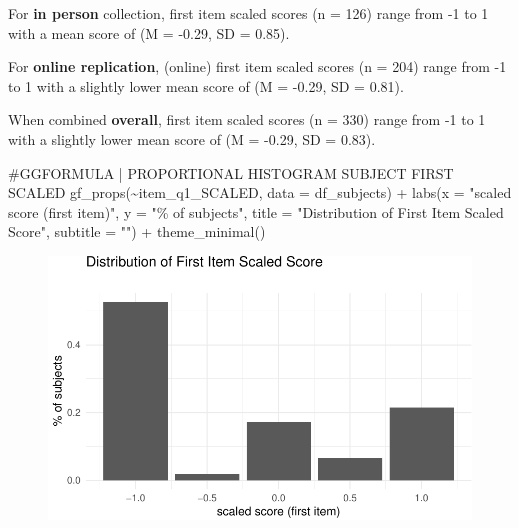 \documentclass[
  letterpaper,
  DIV=11,
  numbers=noendperiod]{scrreprt}
\newenvironment{Shaded}{\begin{snugshade}}{\end{snugshade}}
\newcommand{\AttributeTok}[1]{\textcolor[rgb]{0.40,0.45,0.13}{#1}}
\newcommand{\CommentTok}[1]{\textcolor[rgb]{0.37,0.37,0.37}{#1}}
\newcommand{\FunctionTok}[1]{\textcolor[rgb]{0.28,0.35,0.67}{#1}}
\newcommand{\NormalTok}[1]{\textcolor[rgb]{0.00,0.23,0.31}{#1}}
\newcommand{\SpecialCharTok}[1]{\textcolor[rgb]{0.37,0.37,0.37}{#1}}
\newcommand{\StringTok}[1]{\textcolor[rgb]{0.13,0.47,0.30}{#1}}
\begin{document}
For \textbf{in person} collection, first item scaled scores (n = 126)
range from -1 to 1 with a mean score of (M = -0.29, SD = 0.85).

For \textbf{online replication}, (online) first item scaled scores (n =
204) range from -1 to 1 with a slightly lower mean score of (M = -0.29,
SD = 0.81).

When combined \textbf{overall}, first item scaled scores (n = 330) range
from -1 to 1 with a slightly lower mean score of (M = -0.29, SD = 0.83).

\begin{Shaded}
\begin{Highlighting}[]
\CommentTok{\#GGFORMULA | PROPORTIONAL HISTOGRAM SUBJECT FIRST SCALED}
\FunctionTok{gf\_props}\NormalTok{(}\SpecialCharTok{\textasciitilde{}}\NormalTok{item\_q1\_SCALED, }\AttributeTok{data =}\NormalTok{ df\_subjects) }\SpecialCharTok{+}
  \FunctionTok{labs}\NormalTok{(}\AttributeTok{x =} \StringTok{"scaled score (first item)"}\NormalTok{,}
       \AttributeTok{y =} \StringTok{"\% of subjects"}\NormalTok{,}
       \AttributeTok{title =} \StringTok{"Distribution of First Item Scaled Score"}\NormalTok{,}
       \AttributeTok{subtitle =} \StringTok{""}\NormalTok{) }\SpecialCharTok{+} 
  \FunctionTok{theme\_minimal}\NormalTok{()}
\end{Highlighting}
\end{Shaded}

\begin{figure}[H]

{\centering \includegraphics{analysis/SGC3A/3_sgc3A_description_files/figure-pdf/VIS-FIRST-SCALED-1.pdf}

}

\end{figure}
\end{document}
